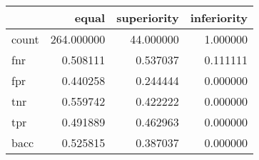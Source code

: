 \begin{tabular}{lrrr}
\toprule
{} &       equal &  superiority &  inferiority \\
\midrule
count &  264.000000 &    44.000000 &     1.000000 \\
fnr   &    0.508111 &     0.537037 &     0.111111 \\
fpr   &    0.440258 &     0.244444 &     0.000000 \\
tnr   &    0.559742 &     0.422222 &     0.000000 \\
tpr   &    0.491889 &     0.462963 &     0.000000 \\
bacc  &    0.525815 &     0.387037 &     0.000000 \\
\bottomrule
\end{tabular}
